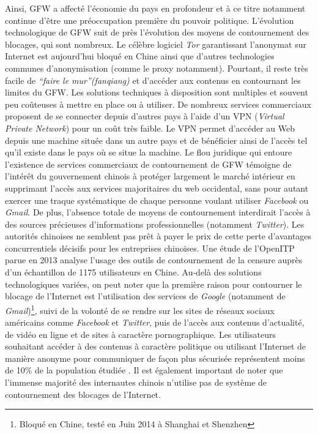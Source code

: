 Ainsi, GFW a affecté l’économie du pays en profondeur et à ce titre notamment continue d’être une préoccupation première du pouvoir politique. L’évolution technologique de GFW suit de près l’évolution des moyens de contournement des blocages, qui sont nombreux. Le célèbre logiciel \textit{Tor} garantissant l’anonymat sur Internet est aujourd’hui bloqué en Chine \citep{Winter2012} ainsi que d’autres technologies communes d’anonymisation (comme le proxy notamment). Pourtant, il reste très facile de \textit{``faire le mur''(fanqiang)} et d’accéder aux contenus en contournant les limites du GFW. Les solutions techniques à disposition sont multiples et souvent peu coûteuses à mettre en place ou à utiliser. De nombreux services commerciaux proposent de se connecter depuis d’autres pays à l’aide d’un VPN (\textit{Virtual Private Network}) pour un coût très faible. Le VPN permet d'accéder au Web depuis une machine située dans un autre pays et de bénéficier ainsi de l’accès tel qu’il existe dans le pays où se situe la machine. Le flou juridique qui entoure l’existence de services commerciaux de contournement de GFW témoigne de l’intérêt du gouvernement chinois à protéger largement le marché intérieur en supprimant l’accès aux services majoritaires du web occidental, sans pour autant exercer une traque systématique de chaque personne voulant utiliser \textit{Facebook} ou \textit{Gmail}. De plus, l’absence totale de moyens de contournement interdirait l’accès à des sources précieuses d’informations professionnelles (notamment \textit{Twitter}). Les autorités chinoises ne semblent pas prêt à payer le prix de cette perte d’avantages concurrentiels décisifs pour les entreprises chinoises. Une étude de l’OpenITP parue en 2013 analyse l’usage des outils de contournement de la censure auprès d’un échantillon de 1175 utilisateurs en Chine. Au-delà des solutions technologiques variées, on peut noter que la première raison pour contourner le blocage de l’Internet est l’utilisation des services de \textit{Google} (notamment de \textit{Gmail})\footnote{Bloqué en Chine, testé en Juin 2014 à Shanghai et Shenzhen}, suivi de la volonté de se rendre sur les sites de réseaux sociaux américains comme \textit{Facebook} et \textit{Twitter}, puis de l’accès aux contenus d’actualité, de vidéo en ligne et de sites à caractère pornographique. Les utilisateurs souhaitant accéder à des contenus à caractère politique ou utilisant l’Internet de manière anonyme pour communiquer de façon plus sécurisée représentent moins de 10\% de la population étudiée \citep{OpenITP2013}. Il est également important de noter que l’immense majorité des internautes chinois n’utilise pas de système de contournement des blocages de l’Internet. 

